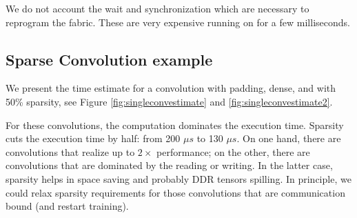 \documentclass{IEEEtran}
\begin{document}
We do not account the wait and synchronization which are necessary to
reprogram the fabric. These are very expensive running on for a few
milliseconds.


\subsection{Sparse Convolution example}

We present the time estimate for a convolution with padding, dense,
and with 50\% sparsity, see Figure \ref{fig:singleconvestimate} and
\ref{fig:singleconvestimate2}.





For these convolutions, the computation dominates the execution
time. Sparsity cuts the execution time by half: from 200 $\mu s$ to
130 $\mu s$. On one hand, there are convolutions that realize up to
$2\times$ performance; on the other, there are convolutions that are
dominated by the reading or writing. In the latter case, sparsity
helps in space saving and probably DDR tensors spilling. In principle,
we could relax sparsity requirements for those convolutions that are
communication bound (and restart training).
\end{document}
